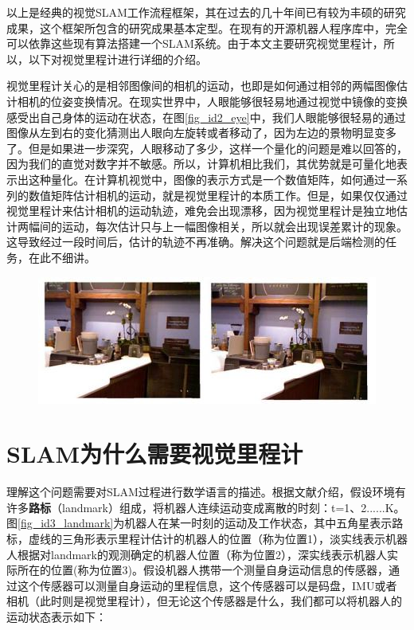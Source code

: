 \documentclass[10.5pt,twocolumn]{jbuaa}
\begin{document}
以上是经典的视觉SLAM工作流程框架，其在过去的几十年间已有较为丰硕的研究成果，这个框架所包含的研究成果基本定型。在现有的开源机器人程序库中，完全可以依靠这些现有算法搭建一个SLAM系统。由于本文主要研究视觉里程计，所以，以下对视觉里程计进行详细的介绍。

视觉里程计关心的是相邻图像间的相机的运动，也即是如何通过相邻的两幅图像估计相机的位姿变换情况。在现实世界中，人眼能够很轻易地通过视觉中镜像的变换感受出自己身体的运动在状态\cite{maer}，在图\ref{fig_id2_eye}中，我们人眼能够很轻易的通过图像从左到右的变化猜测出人眼向左旋转或者移动了，因为左边的景物明显变多了。但是如果进一步深究，人眼移动了多少，这样一个量化的问题是难以回答的，因为我们的直觉对数字并不敏感。所以，计算机相比我们，其优势就是可量化地表示出这种量化。在计算机视觉中，图像的表示方式是一个数值矩阵，如何通过一系列的数值矩阵估计相机的运动，就是视觉里程计的本质工作。但是，如果仅仅通过视觉里程计来估计相机的运动轨迹，难免会出现漂移，因为视觉里程计是独立地估计两幅间的运动，每次估计只与上一幅图像相关，所以就会出现误差累计的现象。这导致经过一段时间后，估计的轨迹不再准确。解决这个问题就是后端检测的任务，在此不细讲。

\begin{figure}[h!]
	\centering
	\includegraphics [scale=0.55,trim=0 0 0 0]{./image/eyes_image}
\end{figure}

\section{SLAM为什么需要视觉里程计}

理解这个问题需要对SLAM过程进行数学语言的描述。根据文献\cite{dummies}介绍，假设环境有许多\textbf{路标}（landmark）组成，将机器人连续运动变成离散的时刻：t=1、2......K。图\ref{fig_id3_landmark}为机器人在某一时刻的运动及工作状态，其中五角星表示路标，虚线的三角形表示里程计估计的机器人的位置（称为位置1），淡实线表示机器人根据对landmark的观测确定的机器人位置（称为位置2），深实线表示机器人实际所在的位置(称为位置3)。假设机器人携带一个测量自身运动信息的传感器，通过这个传感器可以测量自身运动的里程信息，这个传感器可以是码盘，IMU或者相机（此时则是视觉里程计），但无论这个传感器是什么，我们都可以将机器人的运动状态表示如下：
\end{document}
